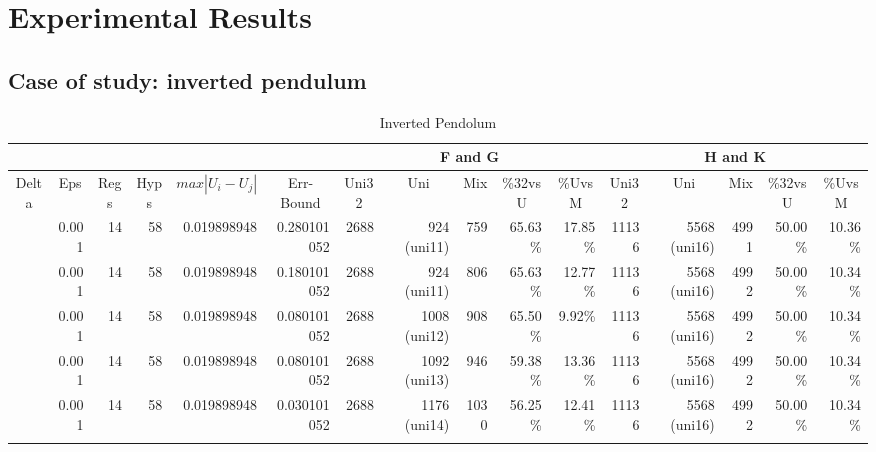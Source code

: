 \section{Experimental Results}
\subsection{Case of study: inverted pendulum}

\begin{landscape}
	\pagestyle{empty}
\begin{table}[p]
	\centering
	\caption{Inverted Pendolum}
	\label{tab:ipd}
	\begin{tabular}{rrrrrrrrrrrrrrrr}
		\cline{7-11}
		\cline{12-16}
		\multicolumn{4}{c}{} &
		\multicolumn{2}{c}{} &
		\multicolumn{5}{c|}{F and G} &
		\multicolumn{5}{c}{H and K} \\
		\hline
		\multicolumn{1}{c}{Delta}&
		\multicolumn{1}{c}{Eps} &
		\multicolumn{1}{c}{Regs} &
		\multicolumn{1}{c}{Hyps} &
		\multicolumn{1}{c}{$max|U_{i}-U_{j}|$} &
		\multicolumn{1}{c}{Err-Bound} &
		\multicolumn{1}{c}{Uni32}&
		\multicolumn{1}{c}{Uni}&
		\multicolumn{1}{c}{Mix}&
		\multicolumn{1}{c}{\%32vsU}&
		\multicolumn{1}{c}{\%UvsM}&
		\multicolumn{1}{c}{Uni32}&
		\multicolumn{1}{c}{Uni}&
		\multicolumn{1}{c}{Mix}&
		\multicolumn{1}{c}{\%32vsU}&
		\multicolumn{1}{c}{\%UvsM} \\
		\hline
		
		\color{red}{0.30} & 0.001 & 14 & 58 & 0.019898948 & 0.280101052 & 2688 & 924 (uni11) & 759 & 65.63\% & 17.85\% & 11136 & 5568 (uni16) & 4991 & 50.00\% & 10.36\% \\
		
		\color{red}{0.20} & 0.001 & 14 & 58 & 0.019898948 & 0.180101052 & 2688 & 924 (uni11) & 806 & 65.63\% & 12.77\% & 11136 & 5568 (uni16)& 4992 & 50.00\% & 10.34\% \\
		
		\color{red}{0.10} & 0.001 & 14 & 58 & 0.019898948 & 0.080101052 & 2688 & 1008 (uni12) & 908 & 65.50\% & 9.92\% & 11136 & 5568 (uni16)& 4992 & 50.00\% & 10.34\% \\
		
		\color{red}{0.08} & 0.001 & 14 & 58 & 0.019898948 & 0.080101052 &2688 & 1092 (uni13) & 946 & 59.38\% & 13.36\% & 11136 & 5568 (uni16) & 4992 & 50.00\% & 10.34\% \\
		
		\color{red}{0.05} & 0.001 & 14 & 58 & 0.019898948 & 0.030101052 & 2688 & 1176 (uni14) & 1030 & 56.25\% & 12.41\% & 11136 & 5568 (uni16) & 4992 & 50.00\% & 10.34\% \\ \\
		

\end{tabular}
\end{table}
\end{landscape}
